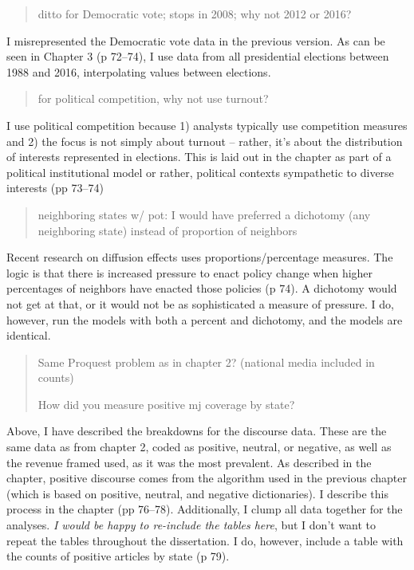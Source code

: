 \documentclass[12pt,stdletter,dateno,sigleft]{newlfm} %
\begin{document}
\begin{newlfm}
\begin{quotation}{\color{red}\noindent \footnotesize
ditto for Democratic vote; stops in 2008; why not 2012 or 2016?
}
\end{quotation}

I misrepresented the Democratic vote data in the previous version. As can be seen in Chapter 3 (p 72--74), I use data from all presidential elections between 1988 and 2016, interpolating values between elections. 

\begin{quotation}{\color{red}\noindent \footnotesize
for political competition, why not use turnout?
}
\end{quotation}

I use political competition because 1) analysts typically use competition measures and 2) the focus is not simply about turnout -- rather, it's about the distribution of interests represented in elections. This is laid out in the chapter as part of a political institutional model or rather, political contexts sympathetic to diverse interests (pp 73--74) 



\begin{quotation}{\color{red}\noindent \footnotesize
neighboring states w/ pot: I would have preferred a dichotomy (any neighboring state) instead of proportion of neighbors
}
\end{quotation}

Recent research on diffusion effects uses proportions/percentage measures. The logic is that there is increased pressure to enact policy change when higher percentages of neighbors have enacted those policies (p 74). A dichotomy would not get at that, or it would not be as sophisticated a measure of pressure. I do, however, run the models with both a percent and dichotomy, and the models are identical. 


\begin{quotation}{\color{red}\noindent \footnotesize
Same Proquest problem as in chapter 2? (national media included in counts)\newline

\noindent How did you measure positive mj coverage by state?
}
\end{quotation}

Above, I have described the breakdowns for the discourse data. These are the same data as from chapter 2, coded as positive, neutral, or negative, as well as the revenue framed used, as it was the most prevalent. As described in the chapter, positive discourse comes from the algorithm used in the previous chapter (which is based on positive, neutral, and negative dictionaries). I describe this process in the chapter (pp 76--78). Additionally, I clump all data together for the analyses. \textit{I would be happy to re-include the tables here}, but I don't want to repeat the tables throughout the dissertation. I do, however, include a table with the counts of positive articles by state (p 79).



\end{newlfm}
\end{document}
